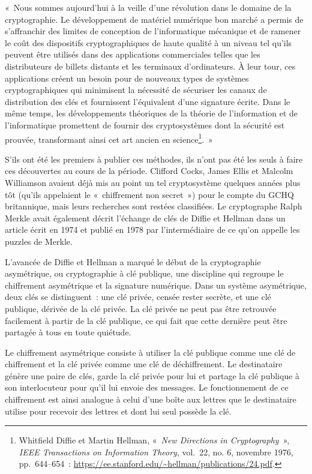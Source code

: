 \documentclass[
  a5paper,
  smalldemyvopaper,10pt,twoside,onecolumn,openright,extrafontsizes,hidelinks]{memoir}
\begin{document}
«~Nous sommes aujourd'hui à la veille d'une révolution dans le domaine
de la cryptographie. Le développement de matériel numérique bon marché a
permis de s'affranchir des limites de conception de l'informatique
mécanique et de ramener le coût des dispositifs cryptographiques de
haute qualité à un niveau tel qu'ils peuvent être utilisés dans des
applications commerciales telles que les distributeurs de billets
distants et les terminaux d'ordinateurs. À leur tour, ces applications
créent un besoin pour de nouveaux types de systèmes cryptographiques qui
minimisent la nécessité de sécuriser les canaux de distribution des clés
et fournissent l'équivalent d'une signature écrite. Dans le même temps,
les développements théoriques de la théorie de l'information et de
l'informatique promettent de fournir des cryptosystèmes dont la sécurité
est prouvée, transformant ainsi cet art ancien en science\footnote{Whitfield
  Diffie et Martin Hellman, «~\emph{New Directions in Cryptography}~»,
  \emph{IEEE Transactions on Information Theory}, vol.~22, no. 6,
  novembre 1976, pp.~644--654~:
  \url{https://ee.stanford.edu/~hellman/publications/24.pdf}.}.~»

S'ils ont été les premiers à publier ces méthodes, ils n'ont pas été les
seuls à faire ces découvertes au cours de la période. Clifford Cocks,
James Ellis et Malcolm Williamson avaient déjà mis au point un tel
cryptosystème quelques années plus tôt (qu'ils appelaient le
«~chiffrement non secret~») pour le compte du GCHQ britannique, mais
leurs recherches sont restées classifiées. Le cryptographe Ralph Merkle
avait également décrit l'échange de clés de Diffie et Hellman dans un
article écrit en 1974 et publié en 1978 par l'intermédiaire de ce qu'on
appelle les puzzles de Merkle.

L'avancée de Diffie et Hellman a marqué le début de la cryptographie
asymétrique, ou cryptographie à clé publique, une discipline qui
regroupe le chiffrement asymétrique et la signature numérique. Dans un
système asymétrique, deux clés se distinguent~: une clé privée, censée
rester secrète, et une clé publique, dérivée de la clé privée. La clé
privée ne peut pas être retrouvée facilement à partir de la clé
publique, ce qui fait que cette dernière peut être partagée à tous en
toute quiétude.

Le chiffrement asymétrique consiste à utiliser la clé publique comme une
clé de chiffrement et la clé privée comme une clé de déchiffrement. Le
destinataire génère une paire de clés, garde la clé privée pour lui et
partage la clé publique à son interlocuteur pour qu'il lui envoie des
messages. Le fonctionnement de ce chiffrement est ainsi analogue à celui
d'une boîte aux lettres que le destinataire utilise pour recevoir des
lettres et dont lui seul possède la clé.
\end{document}
